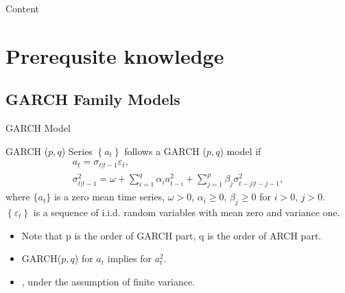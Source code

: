 \begin{frame}
  \titlepage
\end{frame}


\begin{frame}{Content}
  \tableofcontents
\end{frame}




\section{Prerequsite knowledge}
\subsection{GARCH Family Models}
\begin{frame}{GARCH Model}
  \begin{block}{GARCH ($p,q$) \cite{bollerslev1986_garch}}
    Series $\left\{a_{t}\right\}$ follows a GARCH ($p,q$) model if
    \begin{displaymath}
			\begin{array}{c}
				a_{t}=\sigma_{t | t-1}\varepsilon_{t},\\
				\sigma_{t | t-1}^2 = \omega+\sum_{i=1}^q{\alpha_{i}a_{t-i}^2} + \sum_{j=1}^p{\beta_{j}\sigma_{t-j | t-j-1}^2},  
			\end{array}
		\end{displaymath}
		where $\{a_{t}\}$ is a zero mean time series, $\omega > 0$, $\alpha_{i} \geq 0$, $\beta_{j} \geq 0$ for $i>0$, $j>0$. ${\left\{\varepsilon_{t}\right\}}$ is a sequence of i.i.d. random variables with mean zero and variance one.
  \end{block}
  \begin{itemize}
    \item Note that p is the order of GARCH part, q is the order of ARCH part.
    \item GARCH($p, q$) for $a_{t}$ implies  for $a_{t}^2$.
    \item {}, under the assumption of finite variance. 
  \end{itemize}
\end{frame}

